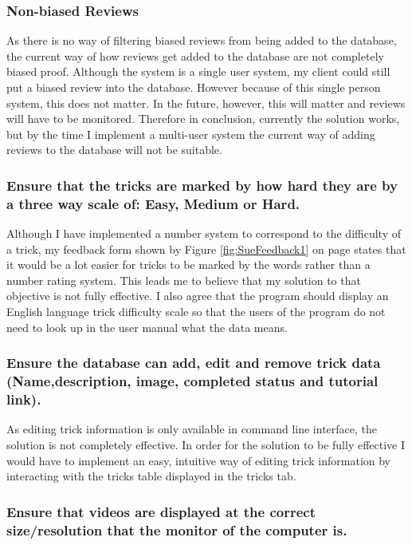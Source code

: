 \subsubsection{Non-biased Reviews}

As there is no way of filtering biased reviews from being added to the database, the current way of how reviews get added to the database are not completely biased proof. Although the system is a single user system, my client could still put a biased review into the database. However because of this single person system, this does not matter. In the future, however, this will matter and reviews will have to be monitored. Therefore in conclusion, currently the solution works, but by the time I implement a multi-user system the current way of adding reviews to the database will not be suitable.

\subsubsection{Ensure that the tricks are marked by how hard they are by a three way scale of: Easy, Medium or Hard.}

Although I have implemented a number system to correspond to the difficulty of a trick, my feedback form shown by Figure \ref{fig:SueFeedback1} on page \pageref{fig:SueFeedback1} states that it would be a lot easier for tricks to be marked by the words rather than a number rating system. This leads me to believe that my solution to that objective is not fully effective. I also agree that the program should display an English language trick difficulty scale so that the users of the program do not need to look up in the user manual what the data means.

	\subsubsection{Ensure the database can add, edit and remove trick data (Name,description, image, completed status and tutorial link).}

As editing trick information is only available in command line interface, the solution is not completely effective. In order for the solution to be fully effective I would have to implement an easy, intuitive way of editing trick information by interacting with the tricks table displayed in the tricks tab.

	\subsubsection{Ensure that videos are displayed at the correct size/resolution that the monitor of the computer is.}

